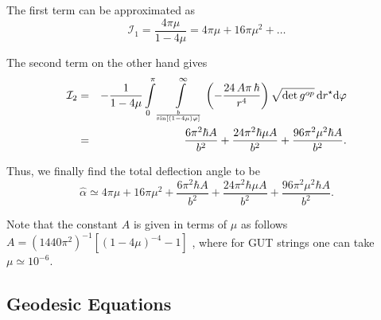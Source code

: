 \documentclass[preprint,superscriptaddress,amsfonts,amssymb,amsmath,showpacs]{revtex4}
\begin{document}
The first term can be approximated as 
\begin{equation}
\mathcal{I}_1=\frac{4 \pi \mu}{1-4 \mu}=4 \pi \mu +16 \pi \mu^2+\hdots
\end{equation}

The second term on the other hand gives
\begin{eqnarray}\notag
\mathcal{I}_2 &=&-\frac{1}{1-4 \mu}\int\limits_{0}^{\pi}\int\limits_{\frac{b}{\sin \left[(1-4\mu)\varphi \right]}}^{\infty}\left(  -{\frac {24\,A\pi\,\hbar }{{r}^{4}}} \right)\sqrt{\det g^{op}}\,\mathrm{d}r^{\star}\mathrm{d}\varphi \\ 
&=& \frac{6 \pi^2 \hbar A}{b^2}+\frac{24 \pi^2 \hbar \mu A}{b^2}+\frac{96 \pi^2 \mu^2 \hbar A}{b^2}.
\end{eqnarray}

Thus, we finally find the total deflection angle to be
\begin{equation}\label{a1}
\hat{\alpha}\simeq 4 \pi \mu+ 16 \pi \mu^2+\frac{6 \pi^2 \hbar A}{b^2}+\frac{24 \pi^2 \hbar \mu A}{b^2}+\frac{96 \pi^2 \mu^2 \hbar A}{b^2}.
\end{equation}

Note that the constant $A$ is given in terms of $\mu$ as follows $A=(1440 \pi^2)^{-1}[(1-4\mu)^{-4}-1]$ \cite{Hiscock1}, where for GUT strings one can take $\mu \simeq 10^{-6}$.


\subsection{Geodesic Equations}
\end{document}
